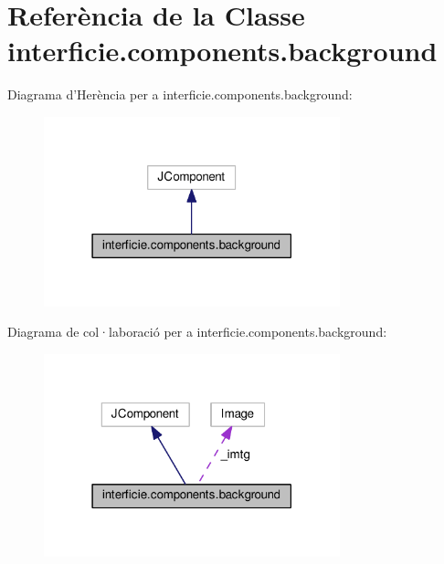 \hypertarget{classinterficie_1_1components_1_1background}{\section{Referència de la Classe interficie.\+components.\+background}
\label{classinterficie_1_1components_1_1background}
}


Diagrama d'Herència per a interficie.\+components.\+background\+:\nopagebreak
\begin{figure}[H]
\begin{center}
\leavevmode
\includegraphics[width=243pt]{classinterficie_1_1components_1_1background__inherit__graph}
\end{center}
\end{figure}


Diagrama de col·laboració per a interficie.\+components.\+background\+:\nopagebreak
\begin{figure}[H]
\begin{center}
\leavevmode
\includegraphics[width=243pt]{classinterficie_1_1components_1_1background__coll__graph}
\end{center}
\end{figure}

